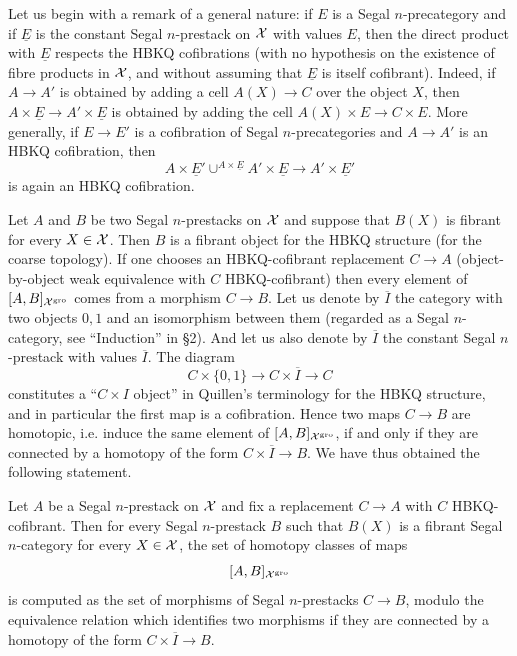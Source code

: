 Let us begin with a remark of a general nature: if $E$ is a Segal
$n$-precategory and if $\underline{E}$ is the constant Segal $n$-prestack on
${\cal X}$ with values $E$, then the direct product with $\underline{E}$ respects
the HBKQ cofibrations (with no hypothesis on the existence of fibre products
in ${\cal X}$, and without assuming that $\underline{E}$ is itself cofibrant).
Indeed, if $A\rightarrow A'$ is obtained by adding a cell $A(X)\rightarrow C$
over the object $X$, then $A\times \underline{E}\rightarrow A'\times
\underline{E}$ is obtained by adding the cell $A(X)\times E \rightarrow C\times
E$. More generally, if $E\rightarrow E'$ is a cofibration of Segal
$n$-precategories and $A\rightarrow A'$ is an HBKQ cofibration, then
$$
A\times \underline{E}' \cup ^{A\times \underline{E}}A'\times \underline{E}
\rightarrow A'\times \underline{E}'
$$
is again an HBKQ cofibration.

Let $A$ and $B$ be two Segal $n$-prestacks on ${\cal X}$ and suppose that $B(X)$ is
fibrant for every $X\in {\cal X}$. Then $B$ is a fibrant object for the HBKQ
structure (for the coarse topology). If one chooses an HBKQ-cofibrant
replacement $C\rightarrow A$ (object-by-object weak equivalence with $C$
HBKQ-cofibrant) then every element of $[A,B]_{{\cal X} ^{\rm gro}}$ comes from a
morphism $C\rightarrow B$. Let us denote by $\overline{I}$ the category with
two objects $0,1$ and an isomorphism between them (regarded as a Segal
$n$-category, see ``Induction'' in \S2). And let us also denote by
$\overline{I}$ the constant Segal $n$-prestack with values $\overline{I}$. The
diagram
$$
C\times \{ 0,1\} \rightarrow C\times \overline{I}\rightarrow C
$$
constitutes a ``$C\times I$ object'' in Quillen's terminology \cite{Quillen}
for the HBKQ structure, and in particular the first map is a cofibration.
Hence two maps $C\rightarrow B$ are homotopic, i.e. induce the same element of
$[A,B]_{{\cal X} ^{\rm gro}}$, if and only if they are connected by a homotopy of
the form $C\times \overline{I}\rightarrow B$. We have thus obtained the
following statement.

\begin{lemma}
\label{howtocalc}
Let $A$ be a Segal $n$-prestack on ${\cal X}$ and fix a replacement $C\rightarrow
A$ with $C$ HBKQ-cofibrant. Then for every Segal $n$-prestack $B$ such that
$B(X)$ is a fibrant Segal $n$-category for every $X\in {\cal X}$, the set of
homotopy classes of maps
$$
[A,B]_{{\cal X} ^{\rm gro}}
$$
is computed as the set of morphisms of Segal $n$-prestacks $C\rightarrow B$,
modulo the equivalence relation which identifies two morphisms if they are
connected by a homotopy of the form $C\times \overline{I}\rightarrow B$.
\end{lemma}
\eop


